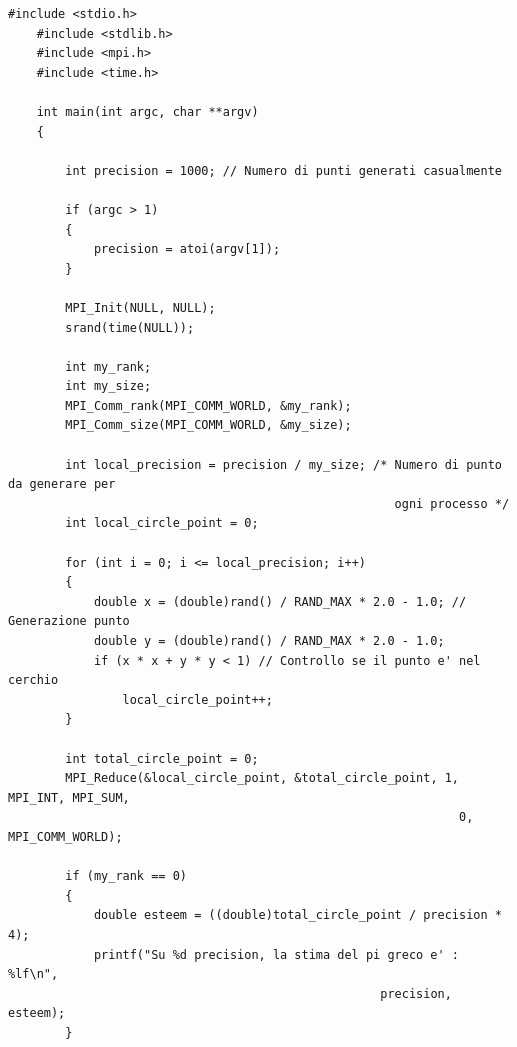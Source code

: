 \documentclass[10pt, letterpaper]{report}
\begin{document}
\begin{lstlisting}[style=CStyle]
    #include <stdio.h>
    #include <stdlib.h>
    #include <mpi.h>
    #include <time.h>
    
    int main(int argc, char **argv)
    {
    
        int precision = 1000; // Numero di punti generati casualmente
    
        if (argc > 1)
        {
            precision = atoi(argv[1]);
        }
    
        MPI_Init(NULL, NULL);
        srand(time(NULL));
    
        int my_rank;
        int my_size;
        MPI_Comm_rank(MPI_COMM_WORLD, &my_rank);
        MPI_Comm_size(MPI_COMM_WORLD, &my_size);
    
        int local_precision = precision / my_size; /* Numero di punto da generare per
                                                      ogni processo */
        int local_circle_point = 0;
    
        for (int i = 0; i <= local_precision; i++)
        {
            double x = (double)rand() / RAND_MAX * 2.0 - 1.0; // Generazione punto
            double y = (double)rand() / RAND_MAX * 2.0 - 1.0;
            if (x * x + y * y < 1) // Controllo se il punto e' nel cerchio
                local_circle_point++;
        }
    
        int total_circle_point = 0;
        MPI_Reduce(&local_circle_point, &total_circle_point, 1, MPI_INT, MPI_SUM,
                                                               0, MPI_COMM_WORLD);
    
        if (my_rank == 0)
        {
            double esteem = ((double)total_circle_point / precision * 4);
            printf("Su %d precision, la stima del pi greco e' : %lf\n",
                                                    precision, esteem);
        }
    

\end{lstlisting}
\end{document}
